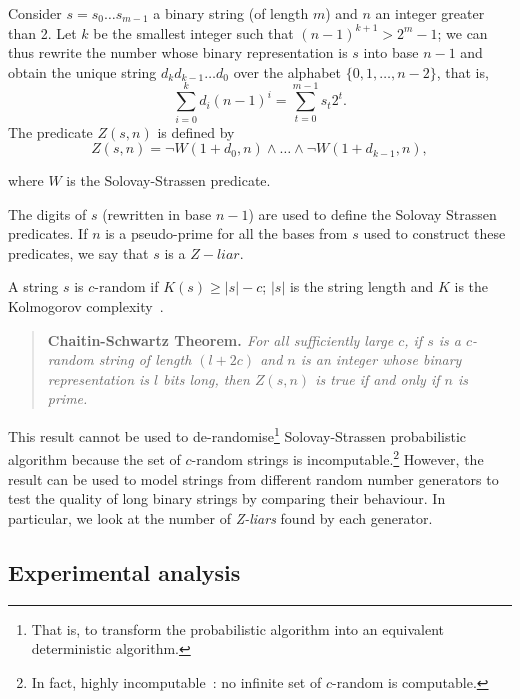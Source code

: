 \documentclass[l1pt]{elsarticle}
\begin{document}
Consider $s=s_{0} \dots s_{m-1}$ a binary string (of length $m$) and $n$ an integer greater than 2.  Let $k$ be the smallest integer such that
$(n-1)^{k+1} >  2^m -1$; we can thus rewrite the number whose binary
representation is $s$ into base $n-1$ and obtain the unique string $d_k d_{k-1}
\dots d_0$ over the alphabet $\{0,1,\dots, n-2\}$, that is,   $$\sum_{i=0}^{k}
d_i(n-1)^{i}=\sum_{t=0}^{m-1}s_t 2^t.$$  The predicate $Z(s,n)$ is defined by
\begin{equation}\label{eq:Zpredicate}
	Z(s,n)= \neg W(1+d_0, n) \wedge \dots  \wedge  \neg W(1+d_{k-1}, n),
\end{equation}

\noindent where $W$ is the Solovay-Strassen predicate.

The digits of $s$ (rewritten in base $n-1$) are used to define the Solovay Strassen predicates. If $n$ is a pseudo-prime for all the bases from $s$ used to construct these predicates, we say that $s$ is a $Z-liar$.

A string $s$ is  $c$-random if $K(s) \ge |s|-c$; $|s|$  is the string length and $K$ is the Kolmogorov complexity~\cite{calude:02}.

\begin{quotation} {\bf Chaitin-Schwartz Theorem. \cite{Chaitin78}}
{\it For all sufficiently large $c$, if $s$ is a $c$-random string of length $(l + 2c)$ and $n$ is an integer whose binary representation is $l$ bits long, then $Z(s, n)$ is true if and only if $n$ is prime.}
\end{quotation}

This result cannot be used to de-randomise\footnote{That is, to transform the probabilistic algorithm into an equivalent deterministic algorithm.} Solovay-Strassen probabilistic algorithm
because the set of $c$-random
strings is incomputable.\footnote{In fact, highly incomputable~\cite{calude:02}: no infinite set of $c$-random is computable. }
However, the result can be used to model strings from different random number generators to
test the quality of long binary strings by comparing their behaviour. In particular, we look at the number of \emph{Z-liars} found by each generator.

\subsection{Experimental analysis}
\end{document}
